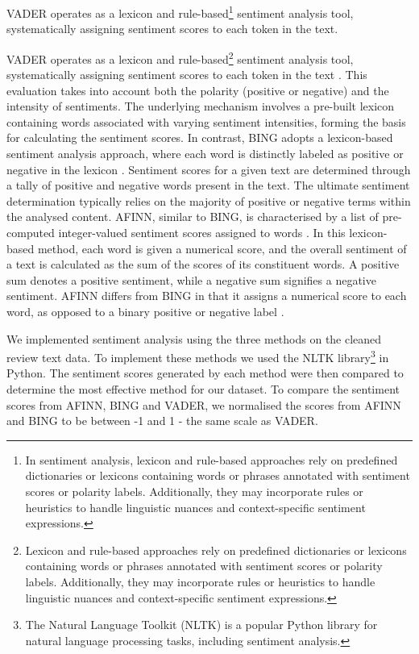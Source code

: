 VADER operates as a lexicon and rule-based\footnote{In sentiment analysis, lexicon and rule-based approaches rely on predefined dictionaries or lexicons containing words or phrases annotated with sentiment scores or polarity labels. Additionally, they may incorporate rules or heuristics to handle linguistic nuances and context-specific sentiment expressions.} sentiment analysis tool, systematically assigning sentiment scores to each token in the text.

VADER operates as a lexicon and rule-based\footnote{Lexicon and rule-based approaches rely on predefined dictionaries or lexicons containing words or phrases annotated with sentiment scores or polarity labels. Additionally, they may incorporate rules or heuristics to handle linguistic nuances and context-specific sentiment expressions.} sentiment analysis tool, systematically assigning sentiment scores to each token in the text \cite{hutto2014vader}. This evaluation takes into account both the polarity (positive or negative) and the intensity of sentiments. The underlying mechanism involves a pre-built lexicon containing words associated with varying sentiment intensities, forming the basis for calculating the sentiment scores. In contrast, BING adopts a lexicon-based sentiment analysis approach, where each word is distinctly labeled as positive or negative in the lexicon \cite{hu2004mining}. Sentiment scores for a given text are determined through a tally of positive and negative words present in the text. The ultimate sentiment determination typically relies on the majority of positive or negative terms within the analysed content. AFINN, similar to BING, is characterised by a list of pre-computed integer-valued sentiment scores assigned to words \cite{nielsen2011new}. In this lexicon-based method, each word is given a numerical score, and the overall sentiment of a text is calculated as the sum of the scores of its constituent words. A positive sum denotes a positive sentiment, while a negative sum signifies a negative sentiment. AFINN differs from BING in that it assigns a numerical score to each word, as opposed to a binary positive or negative label \cite{medhat2014sentiment}.

We implemented sentiment analysis using the three methods on the cleaned review text data. To implement these methods we used the NLTK library\footnote{The Natural Language Toolkit (NLTK) is a popular Python library for natural language processing tasks, including sentiment analysis.} in Python. The sentiment scores generated by each method were then compared to determine the most effective method for our dataset. To compare the sentiment scores from AFINN, BING and VADER, we normalised the scores from AFINN and BING to be between -1 and 1 - the same scale as VADER.

